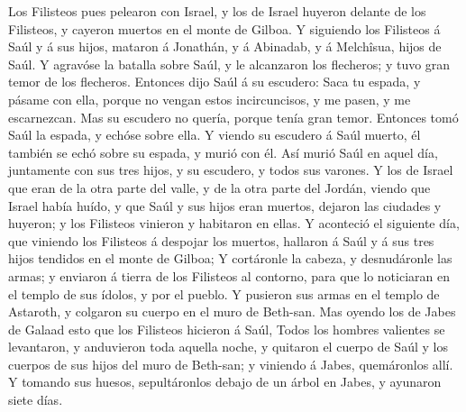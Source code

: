  Los Filisteos pues pelearon con Israel, y los de Israel
huyeron delante de los Filisteos, y cayeron muertos en el monte de
Gilboa.  Y siguiendo los Filisteos á Saúl y á sus hijos,
mataron á Jonathán, y á Abinadab, y á Melchîsua, hijos de Saúl.
 Y agravóse la batalla sobre Saúl, y le alcanzaron los
flecheros; y tuvo gran temor de los flecheros.  Entonces
dijo Saúl á su escudero: Saca tu espada, y pásame con ella, porque no
vengan estos incircuncisos, y me pasen, y me escarnezcan. Mas su
escudero no quería, porque tenía gran temor. Entonces tomó Saúl la
espada, y echóse sobre ella.  Y viendo su escudero á Saúl
muerto, él también se echó sobre su espada, y murió con él. 
Así murió Saúl en aquel día, juntamente con sus tres hijos, y su
escudero, y todos sus varones.  Y los de Israel que eran de
la otra parte del valle, y de la otra parte del Jordán, viendo que
Israel había huído, y que Saúl y sus hijos eran muertos, dejaron las
ciudades y huyeron; y los Filisteos vinieron y habitaron en ellas.
 Y aconteció el siguiente día, que viniendo los Filisteos á
despojar los muertos, hallaron á Saúl y á sus tres hijos tendidos en el
monte de Gilboa;  Y cortáronle la cabeza, y desnudáronle las
armas; y enviaron á tierra de los Filisteos al contorno, para que lo
noticiaran en el templo de sus ídolos, y por el pueblo.  Y
pusieron sus armas en el templo de Astaroth, y colgaron su cuerpo en el
muro de Beth-san.  Mas oyendo los de Jabes de Galaad esto
que los Filisteos hicieron á Saúl,  Todos los hombres
valientes se levantaron, y anduvieron toda aquella noche, y quitaron el
cuerpo de Saúl y los cuerpos de sus hijos del muro de Beth-san; y
viniendo á Jabes, quemáronlos allí.  Y tomando sus huesos,
sepultáronlos debajo de un árbol en Jabes, y ayunaron siete días.
